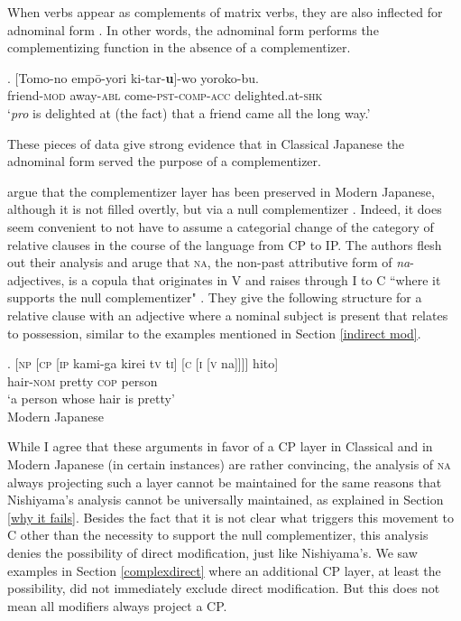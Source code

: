When verbs appear as complements of matrix verbs, they are also inflected for adnominal form \citep[10–11]{kinsui:1995:iwayuru}. In other words, the adnominal form performs the complementizing function in the absence of a complementizer. %

\exg. [Tomo-no empō-yori ki-tar-\textbf{u}]-wo yoroko-bu.\\
friend-\textsc{mod} away-\textsc{abl} come-\textsc{pst-comp}-\textsc{acc} delighted.at-\textsc{shk}\\
`\textit{pro} is delighted at (the fact) that a friend came all the long way.’ \\ \null \hfill \citep[10]{kinsui:1995:iwayuru}

These pieces of data give strong evidence that in  Classical Japanese the adnominal form served the purpose of a complementizer.

\citet{kaplan:1995:the} argue that the complementizer layer has been preserved in Modern Japanese, although it is not filled overtly, but via a null complementizer \citep[33–35]{kaplan:1995:the}. Indeed, it does seem convenient to not have to assume a categorial change of the category of relative clauses in the course of the language from CP to IP. The authors flesh out their analysis and aruge that  \textsc{na}, the non-past attributive form of \textit{na}-adjectives, is a copula that originates in V and raises through I to C ``where it supports the null complementizer" \citep[34]{kaplan:1995:the}. They give the following structure for a relative clause with an adjective where a nominal subject is present that relates to possession, similar to the examples mentioned in Section \ref{indirect mod}. 

\exg. [\textsc{np} [\textsc{cp} [\textsc{ip} kami-ga kirei t\textsc{v} t\textsc{i}] [\textsc{c} [\textsc{i} [\textsc{v} na]]]] hito]\\
{} {} {} hair-\textsc{nom} pretty {} {} {} {} {} \textsc{cop} person\\
`a person whose hair is pretty' \\ \null \hfill Modern Japanese \citep[34]{kaplan:1995:the}

While I agree that these arguments in favor of a CP layer in Classical and in Modern Japanese (in certain instances) are rather convincing, the analysis of \textsc{na} always projecting such a layer cannot be maintained for the same reasons that Nishiyama’s analysis cannot be universally maintained, as explained in Section \ref{why it fails}. Besides the fact that it is not clear what triggers this movement to C other than the necessity to support the null complementizer, this analysis denies the possibility of direct modification, just like Nishiyama’s. We saw examples in Section \ref{complexdirect} where an additional CP layer, at least the possibility, did not immediately exclude direct modification. But this does not mean all modifiers always project a CP. %

